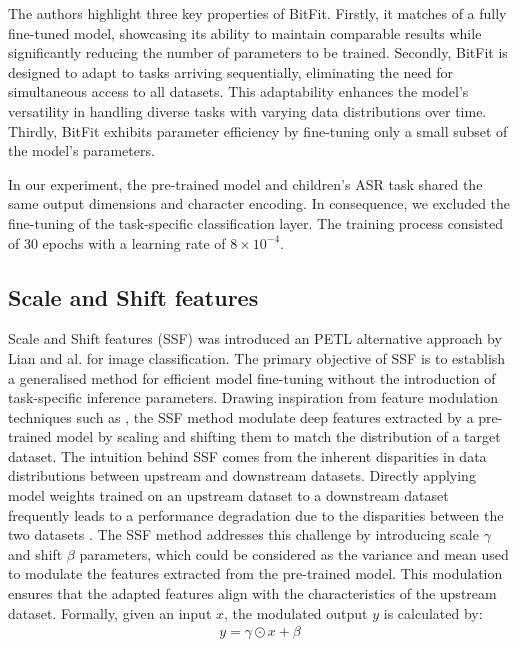 The authors highlight three key properties of BitFit. Firstly, it matches of a fully fine-tuned model, showcasing its ability to maintain comparable results while significantly reducing the number of parameters to be trained. Secondly, BitFit is designed to adapt to tasks arriving sequentially, eliminating the need for simultaneous access to all datasets. This adaptability enhances the model's versatility in handling diverse tasks with varying data distributions over time. Thirdly, BitFit exhibits parameter efficiency by fine-tuning only a small subset of the model's parameters.

In our experiment, the pre-trained model and children's ASR task shared the same output dimensions and character encoding. In consequence, we excluded the fine-tuning of the task-specific classification layer. The training process consisted of 30 epochs with a learning rate of $8 \times 10^{-4}$.

\subsection{Scale and Shift features}
Scale and Shift features (SSF) was introduced an PETL alternative approach by Lian and al. \cite{lian2022scaling} for image classification. The primary objective of SSF is to establish a generalised method for efficient model fine-tuning without the introduction of task-specific inference parameters. Drawing inspiration from feature modulation techniques such as \cite{wu2018group,huang2017arbitrary}, the SSF method modulate deep features extracted by a pre-trained model by scaling and shifting them to match the distribution of a target dataset. 
The intuition behind SSF comes from the inherent disparities in data distributions between upstream and downstream datasets. Directly applying model weights trained on an upstream dataset to a downstream dataset frequently leads to a performance degradation due to the disparities between the two datasets \cite{sun2016return}. The SSF method addresses this challenge by introducing scale $\gamma$ and shift $\beta$ parameters, which could be considered as the variance and mean used to modulate the features extracted from the pre-trained model. This modulation ensures that the adapted features align with the characteristics of the upstream dataset. Formally, given an input $x$, the modulated output $y$ is calculated by:
\begin{align}
    y = \gamma \odot x + \beta
\end{align}

